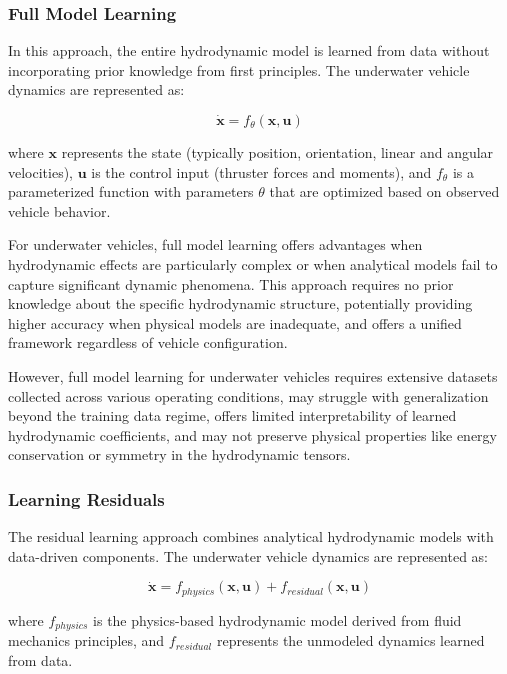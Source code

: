 \subsubsection{Full Model Learning}
In this approach, the entire hydrodynamic model is learned from data without incorporating prior knowledge from first principles. The underwater vehicle dynamics are represented as:

\begin{equation}
\dot{\mathbf{x}} = f_{\theta}(\mathbf{x}, \mathbf{u})
\end{equation}

where $\mathbf{x}$ represents the state (typically position, orientation, linear and angular velocities), $\mathbf{u}$ is the control input (thruster forces and moments), and $f_{\theta}$ is a parameterized function with parameters $\theta$ that are optimized based on observed vehicle behavior.

For underwater vehicles, full model learning offers advantages when hydrodynamic effects are particularly complex or when analytical models fail to capture significant dynamic phenomena. This approach requires no prior knowledge about the specific hydrodynamic structure, potentially providing higher accuracy when physical models are inadequate, and offers a unified framework regardless of vehicle configuration.

However, full model learning for underwater vehicles requires extensive datasets collected across various operating conditions, may struggle with generalization beyond the training data regime, offers limited interpretability of learned hydrodynamic coefficients, and may not preserve physical properties like energy conservation or symmetry in the hydrodynamic tensors.

\subsubsection{Learning Residuals}
The residual learning approach combines analytical hydrodynamic models with data-driven components. The underwater vehicle dynamics are represented as:

\begin{equation}
\dot{\mathbf{x}} = f_{physics}(\mathbf{x}, \mathbf{u}) + f_{residual}(\mathbf{x}, \mathbf{u})
\end{equation}

where $f_{physics}$ is the physics-based hydrodynamic model derived from fluid mechanics principles, and $f_{residual}$ represents the unmodeled dynamics learned from data.


